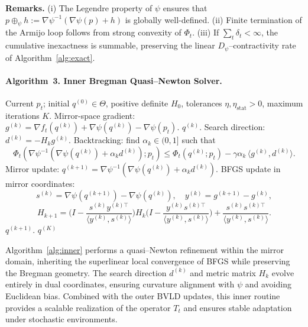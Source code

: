 \documentclass[11pt]{article}
\newcommand{\inner}[2]{\langle #1 , #2 \rangle}
\theoremstyle{plain}
\theoremstyle{definition}
\theoremstyle{remark}
\begin{document}
\noindent
\textbf{Remarks.}
(i) The Legendre property of $\psi$ ensures that 
$p\oplus_\psi h:=\nabla\psi^{-1}(\nabla\psi(p)+h)$ is globally well-defined.  
(ii) Finite termination of the Armijo loop follows from strong convexity of $\Phi_t$.  
(iii) If $\sum_t\delta_t<\infty$, the cumulative inexactness is summable, 
preserving the linear $D_\psi$--contractivity rate of Algorithm~\ref{alg:exact}.

\paragraph{Algorithm~3. Inner Bregman Quasi--Newton Solver.}

\begin{algorithm}[!htbp]
\caption{Inner Solver for $\min_{q\in\Theta}f_t(q)+D_\psi(q\|p_t)$ (Bregman Quasi--Newton)}
\label{alg:inner}
\begin{algorithmic}[1]
\Require Current $p_t$; initial $q^{(0)}\in\Theta$, positive definite $H_0$, 
tolerances $\eta,\eta_{\mathrm{stat}}>0$, maximum iterations $K$.
  \State Mirror-space gradient: 
  $g^{(k)}=\nabla f_t(q^{(k)})+\nabla\psi(q^{(k)})-\nabla\psi(p_t)$.
    \State \Return $q^{(k)}$.
  \EndIf
  \State Search direction: $d^{(k)}=-H_k g^{(k)}$.
  \State Backtracking: find $\alpha_k\in(0,1]$ such that
  \[
  \Phi_t(\nabla\psi^{-1}(\nabla\psi(q^{(k)})+\alpha_k d^{(k)});p_t)
  \le\Phi_t(q^{(k)};p_t)
  -\gamma\alpha_k\,\inner{g^{(k)}}{d^{(k)}}.
  \]
  \State Mirror update:
  $q^{(k+1)}=\nabla\psi^{-1}(\nabla\psi(q^{(k)})+\alpha_k d^{(k)})$.
  \State BFGS update in mirror coordinates:
  \[
  s^{(k)}=\nabla\psi(q^{(k+1)})-\nabla\psi(q^{(k)}),\quad
  y^{(k)}=g^{(k+1)}-g^{(k)},
  \]
  \[
  H_{k+1}=
  \Big(I-\frac{s^{(k)}y^{(k)\top}}{\inner{y^{(k)}}{s^{(k)}}}\Big)
  H_k
  \Big(I-\frac{y^{(k)}s^{(k)\top}}{\inner{y^{(k)}}{s^{(k)}}}\Big)
  +\frac{s^{(k)}s^{(k)\top}}{\inner{y^{(k)}}{s^{(k)}}}.
  \]
    \State \Return $q^{(k+1)}$.
  \EndIf
\EndFor
\State \Return $q^{(K)}$
\end{algorithmic}
\end{algorithm}

\noindent
Algorithm~\ref{alg:inner} performs a quasi--Newton refinement within the 
mirror domain, inheriting the superlinear local convergence of BFGS 
while preserving the Bregman geometry.  
The search direction $d^{(k)}$ and metric matrix $H_k$ evolve entirely 
in dual coordinates, ensuring curvature alignment with $\psi$ 
and avoiding Euclidean bias.  
Combined with the outer BVLD updates, this inner routine provides 
a scalable realization of the operator $T_t$ and ensures stable adaptation 
under stochastic environments.
\end{document}
